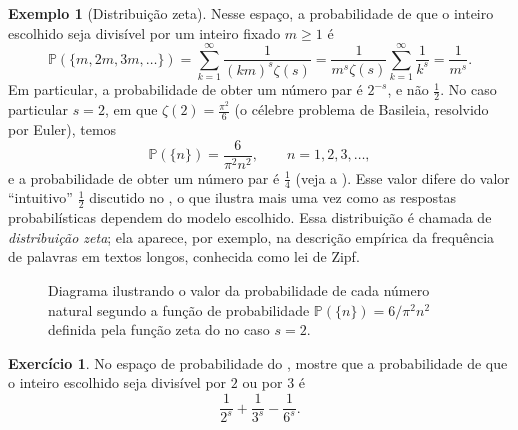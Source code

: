 \documentclass[12pt,portuguese]{article}
\let\geq\geqslant
\theoremstyle{definition}
\newtheorem{example}[example]{Exemplo}
\newtheorem{exercise}{Exercício}
\begin{document}
\begin{example}[Distribuição zeta]
Nesse espaço, a probabilidade de que o inteiro escolhido seja divisível
por um inteiro fixado \(m \geq 1\) é
\[
\mathbb{P}(\{m, 2m, 3m, \dots\})
= \sum_{k=1}^{\infty} \frac{1}{(km)^s \zeta(s)}
= \frac{1}{m^s \zeta(s)} \sum_{k=1}^{\infty} \frac{1}{k^s}
= \frac{1}{m^s}.
\]
Em particular, a probabilidade de obter um número par é \(2^{-s}\), e não
\(\tfrac{1}{2}\). No caso particular \(s = 2\), em que
\(\zeta(2) = \tfrac{\pi^2}{6}\) (o célebre problema de Basileia,
resolvido por Euler), temos
\[
\mathbb{P}(\{n\}) = \frac{6}{\pi^2 n^2}, \qquad n = 1, 2, 3, \dots,
\]
e a probabilidade de obter um número par é \(\tfrac{1}{4}\) (veja a
). Esse valor
difere do valor ``intuitivo'' \(\tfrac{1}{2}\) discutido no
, o que ilustra mais uma vez como as respostas
probabilísticas dependem do modelo escolhido. Essa distribuição é chamada
de \emph{distribuição zeta}; ela aparece, por exemplo, na descrição empírica
da frequência de palavras em textos longos, conhecida
como lei de Zipf.
\end{example}

\begin{figure}[htbp]
\centering
{}
\caption{Diagrama ilustrando o valor da probabilidade de cada número natural segundo
a função de probabilidade \(\mathbb{P}(\{n\}) = 6/\pi^2 n^2\)
definida pela função zeta do
 no caso \(s=2\).}\label{fig:zeta-massas}
\end{figure}

\begin{exercise}\label{exercise:zeta}
No espaço de probabilidade do , mostre que a probabilidade
de que o inteiro escolhido seja divisível por \(2\) ou por \(3\) é
\[
\frac{1}{2^s} + \frac{1}{3^s} - \frac{1}{6^s}.
\]
\end{exercise}
\end{document}
